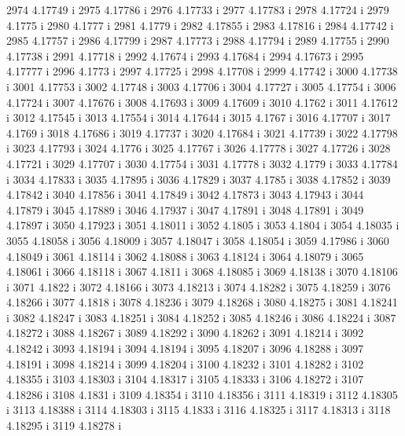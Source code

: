  2974  4.17749  i
 2975  4.17786  i
 2976  4.17733  i
 2977  4.17783  i
 2978  4.17724  i
 2979  4.1775  i
 2980  4.1777  i
 2981  4.1779  i
 2982  4.17855  i
 2983  4.17816  i
 2984  4.17742  i
 2985  4.17757  i
 2986  4.17799  i
 2987  4.17773  i
 2988  4.17794  i
 2989  4.17755  i
 2990  4.17738  i
 2991  4.17718  i
 2992  4.17674  i
 2993  4.17684  i
 2994  4.17673  i
 2995  4.17777  i
 2996  4.1773  i
 2997  4.17725  i
 2998  4.17708  i
 2999  4.17742  i
 3000  4.17738  i
 3001  4.17753  i
 3002  4.17748  i
 3003  4.17706  i
 3004  4.17727  i
 3005  4.17754  i
 3006  4.17724  i
 3007  4.17676  i
 3008  4.17693  i
 3009  4.17609  i
 3010  4.1762  i
 3011  4.17612  i
 3012  4.17545  i
 3013  4.17554  i
 3014  4.17644  i
 3015  4.1767  i
 3016  4.17707  i
 3017  4.1769  i
 3018  4.17686  i
 3019  4.17737  i
 3020  4.17684  i
 3021  4.17739  i
 3022  4.17798  i
 3023  4.17793  i
 3024  4.1776  i
 3025  4.17767  i
 3026  4.17778  i
 3027  4.17726  i
 3028  4.17721  i
 3029  4.17707  i
 3030  4.17754  i
 3031  4.17778  i
 3032  4.1779  i
 3033  4.17784  i
 3034  4.17833  i
 3035  4.17895  i
 3036  4.17829  i
 3037  4.1785  i
 3038  4.17852  i
 3039  4.17842  i
 3040  4.17856  i
 3041  4.17849  i
 3042  4.17873  i
 3043  4.17943  i
 3044  4.17879  i
 3045  4.17889  i
 3046  4.17937  i
 3047  4.17891  i
 3048  4.17891  i
 3049  4.17897  i
 3050  4.17923  i
 3051  4.18011  i
 3052  4.1805  i
 3053  4.1804  i
 3054  4.18035  i
 3055  4.18058  i
 3056  4.18009  i
 3057  4.18047  i
 3058  4.18054  i
 3059  4.17986  i
 3060  4.18049  i
 3061  4.18114  i
 3062  4.18088  i
 3063  4.18124  i
 3064  4.18079  i
 3065  4.18061  i
 3066  4.18118  i
 3067  4.1811  i
 3068  4.18085  i
 3069  4.18138  i
 3070  4.18106  i
 3071  4.1822  i
 3072  4.18166  i
 3073  4.18213  i
 3074  4.18282  i
 3075  4.18259  i
 3076  4.18266  i
 3077  4.1818  i
 3078  4.18236  i
 3079  4.18268  i
 3080  4.18275  i
 3081  4.18241  i
 3082  4.18247  i
 3083  4.18251  i
 3084  4.18252  i
 3085  4.18246  i
 3086  4.18224  i
 3087  4.18272  i
 3088  4.18267  i
 3089  4.18292  i
 3090  4.18262  i
 3091  4.18214  i
 3092  4.18242  i
 3093  4.18194  i
 3094  4.18194  i
 3095  4.18207  i
 3096  4.18288  i
 3097  4.18191  i
 3098  4.18214  i
 3099  4.18204  i
 3100  4.18232  i
 3101  4.18282  i
 3102  4.18355  i
 3103  4.18303  i
 3104  4.18317  i
 3105  4.18333  i
 3106  4.18272  i
 3107  4.18286  i
 3108  4.1831  i
 3109  4.18354  i
 3110  4.18356  i
 3111  4.18319  i
 3112  4.18305  i
 3113  4.18388  i
 3114  4.18303  i
 3115  4.1833  i
 3116  4.18325  i
 3117  4.18313  i
 3118  4.18295  i
 3119  4.18278  i
